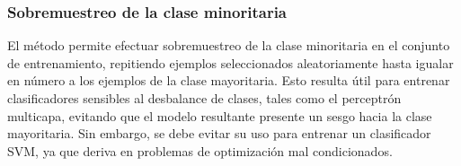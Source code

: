 %
\subsubsection{Sobremuestreo de la clase minoritaria}
%
El método permite efectuar sobremuestreo de la clase minoritaria en el
conjunto de entrenamiento, repitiendo ejemplos seleccionados
aleatoriamente hasta igualar en número a los ejemplos de la clase
mayoritaria.
Esto resulta útil para entrenar clasificadores sensibles al desbalance
de clases, tales como el perceptrón multicapa, evitando que el modelo
resultante presente un sesgo hacia la clase mayoritaria.
Sin embargo, se debe evitar su uso para entrenar un clasificador SVM,
ya que deriva en problemas de optimización mal condicionados.
